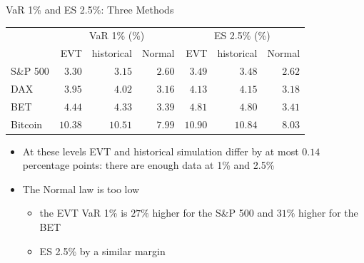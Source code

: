 \begin{frame}{VaR 1\% and ES 2.5\%: Three Methods}
\itemsize{\footnotesize}
\begin{center}
\footnotesize
\begin{tabular}{l|rrr|rrr}
\toprule
& \multicolumn{3}{c|}{VaR 1\% (\%)} & \multicolumn{3}{c}{ES 2.5\% (\%)} \\ & EVT & historical & Normal & EVT & historical & Normal \\
\midrule
S\&P 500 & $3.30$ & $3.15$ & $2.60$ & $3.49$ & $3.48$ & $2.62$ \\
DAX & $3.95$ & $4.02$ & $3.16$ & $4.13$ & $4.15$ & $3.18$ \\
BET & $4.44$ & $4.33$ & $3.39$ & $4.81$ & $4.80$ & $3.41$ \\
Bitcoin & $10.38$ & $10.51$ & $7.99$ & $10.90$ & $10.84$ & $8.03$ \\
\bottomrule
\end{tabular}
\end{center}
\begin{itemize}
    \item At these levels EVT and historical simulation differ by at most $0.14$ percentage points: there are enough data at 1\% and 2.5\%
    \item The Normal law is too low
    \begin{itemize}
        \item the EVT VaR 1\% is $27\%$ higher for the S\&P 500 and $31\%$ higher for the BET
        \item ES 2.5\% by a similar margin
    \end{itemize}
\end{itemize}
\end{frame}

